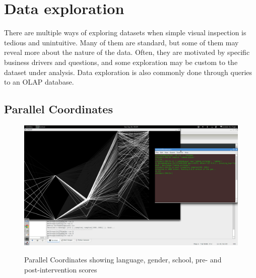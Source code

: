 \documentclass[10pt]{article}
\begin{document}
\newpage
\section{Data exploration}
There are multiple ways of exploring datasets when simple visual inspection is tedious and unintuitive. Many of them are standard, but some of them may reveal more about the nature of the data. Often, they are motivated by specific business drivers and questions, and some exploration may be custom to the dataset under analysis. Data exploration is also commonly done through queries to an OLAP database.
\newpage
\subsection{Parallel Coordinates}
\begin{figure}
\caption{Parallel Coordinates showing language, gender, school, pre- and post-intervention scores}
\label{ParallelCoordinates}
\begin{center}
\includegraphics[width=150mm]{ReportMedia/ParallelCoordinates.jpg}\\
\end{center}
\end{figure}
\newpage
\end{document}
